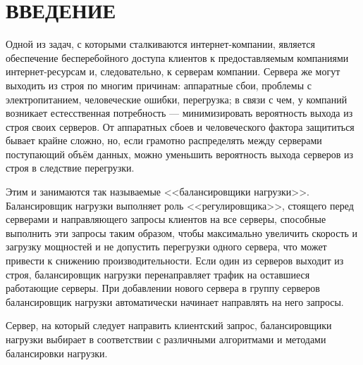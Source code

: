 \section*{ВВЕДЕНИЕ}

Одной из задач, с которыми сталкиваются интернет-компании, является обеспечение бесперебойного доступа клиентов к предоставляемым компаниями интернет-ресурсам и, следовательно, к серверам компании.
Сервера же могут выходить из строя по многим причинам: аппаратные сбои, проблемы с электропитанием, человеческие ошибки, перегрузка; в связи с чем, у компаний возникает естесственная потребность --- минимизировать вероятность выхода из строя своих серверов.
От аппаратных сбоев и человеческого фактора защититься бывает крайне сложно, но, если грамотно распределять между серверами поступающий объём данных, можно уменьшить вероятность выхода серверов из строя в следствие перегрузки.

Этим и занимаются так называемые <<балансировщики нагрузки>>.
Балансировщик нагрузки выполняет роль <<регулировщика>>, стоящего перед серверами и направляющего запросы клиентов на все серверы, способные выполнить эти запросы таким образом, чтобы максимально увеличить скорость и загрузку мощностей и не допустить перегрузки одного сервера, что может привести к снижению производительности.
Если один из серверов выходит из строя, балансировщик нагрузки перенаправляет трафик на оставшиеся работающие серверы.
При добавлении нового сервера в группу серверов балансировщик нагрузки автоматически начинает направлять на него запросы.~\cite{nginx}

Сервер, на который следует направить клиентский запрос, балансировщики нагрузки выбирает в соответствии с различными алгоритмами и методами балансировки нагрузки.

